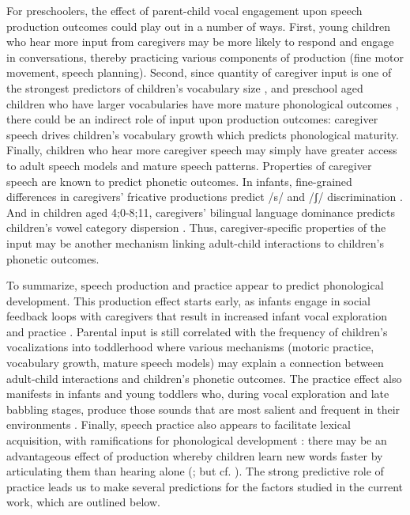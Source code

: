 \documentclass[a4paper,man,natbib,donotrepeattitle, apacite]{apa6}
\begin{document}
For preschoolers, the effect of parent-child vocal engagement upon speech production outcomes could play out in a number of ways. First, young children who hear more input from caregivers may be more likely to respond and engage in conversations, thereby practicing various components of production (fine motor movement, speech planning). Second, since quantity of caregiver input is one of the strongest predictors of children’s vocabulary size \cite{hoffSpecificityEnvironmentalInfluence2003}, and preschool aged children who have larger vocabularies have more mature phonological outcomes \cite{stoel-gammonRelationshipsLexicalPhonological2011,storkelLexiconPhonologyInteractions2002}, there could be an indirect role of input upon production outcomes: caregiver speech drives children’s vocabulary growth which predicts phonological maturity. Finally, children who hear more caregiver speech may simply have greater access to adult speech models and mature speech patterns. Properties of caregiver speech are known to predict phonetic outcomes. In infants, fine-grained differences in caregivers’ fricative productions predict /s/ and /ʃ/ discrimination \cite{cristiaFinegrainedVariationCaregivers2011}. And in children aged 4;0-8;11, caregivers’ bilingual language dominance predicts children’s vowel category dispersion \cite{cychoszPhoneticDevelopmentAgglutinating2020}. Thus, caregiver-specific properties of the input may be another mechanism linking adult-child interactions to children’s phonetic outcomes.

To summarize, speech production and practice appear to predict phonological development. This production effect starts early, as infants engage in social feedback loops with caregivers that result in increased infant vocal exploration and practice \cite{franklinEffectsParentalInteraction2014,goldsteinSocialFeedbackInfants2008,mcgillionWhatPavesWay2017,pretzerInfantadultVocalInteraction2019,warlaumontSocialFeedbackLoop2014}. Parental input is still correlated with the frequency of children’s vocalizations into toddlerhood 
\cite{gilkersonImpactAdultTalk2009,weislederTalkingChildrenMatters2013} where various mechanisms (motoric practice, vocabulary growth, mature speech models) may explain a connection between adult-child interactions and children's phonetic outcomes. The practice effect also manifests in infants and young toddlers who, during vocal exploration and late babbling stages, produce those sounds that are most salient and frequent in their environments \cite{depaolisProductionPatternsInfluence2011,depaolisInfluenceBabblingPatterns2013,laingBabbleWordsInfants2020,vihmanVariablePathsEarly1993,vihmanLearningWordsLearning2017}. Finally, speech practice also appears to facilitate lexical acquisition, with ramifications for phonological development \cite{sosaLexicalPhonologicalEffects2012,stoel-gammonRelationshipsLexicalPhonological2011,zamunerPhonotacticProbabilitiesOnset2009}: there may be an advantageous effect of production whereby children learn new words faster by articulating them than hearing alone (; but cf. ). The strong predictive role of practice leads us to make several predictions for the factors studied in the current work, which are outlined below. 
\end{document}
